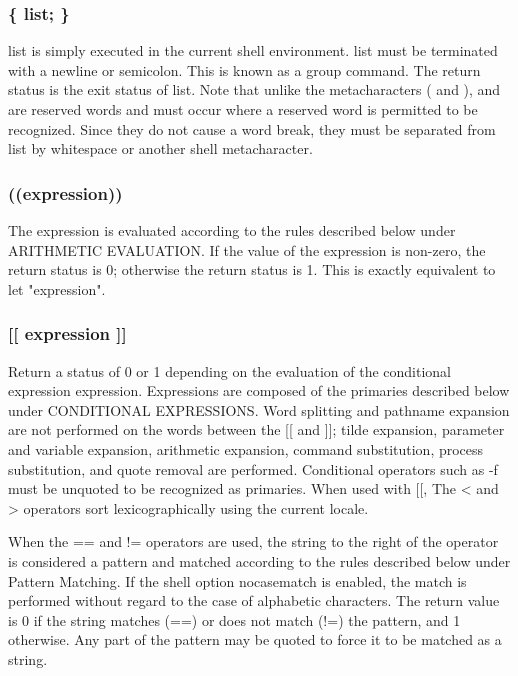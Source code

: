 \subsubsection*{\{ list; \}}
list is simply executed in the current shell environment. list must be terminated with a newline or semicolon. This is known as a group command. The return status is the exit status of list. Note that unlike the metacharacters ( and ), { and } are reserved words and must occur where a reserved word is permitted to be recognized. Since they do not cause a word break, they must be separated from list by whitespace or another shell metacharacter.
\subsubsection*{((expression))}
The expression is evaluated according to the rules described below under ARITHMETIC EVALUATION. If the value of the expression is non-zero, the return status is 0; otherwise the return status is 1. This is exactly equivalent to let "expression".
\subsubsection*{[[ expression ]]}
Return a status of 0 or 1 depending on the evaluation of the conditional expression expression. Expressions are composed of the primaries described below under CONDITIONAL EXPRESSIONS. Word splitting and pathname expansion are not performed on the words between the [[ and ]]; tilde expansion, parameter and variable expansion, arithmetic expansion, command substitution, process substitution, and quote removal are performed. Conditional operators such as -f must be unquoted to be recognized as primaries.
When used with [[, The < and > operators sort lexicographically using the current locale.

When the == and != operators are used, the string to the right of the operator is considered a pattern and matched according to the rules described below under Pattern Matching. If the shell option nocasematch is enabled, the match is performed without regard to the case of alphabetic characters. The return value is 0 if the string matches (==) or does not match (!=) the pattern, and 1 otherwise. Any part of the pattern may be quoted to force it to be matched as a string.

